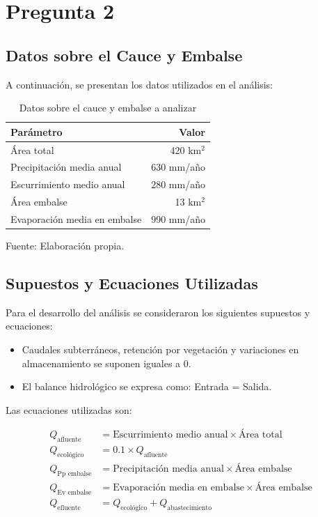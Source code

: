 \documentclass{article} %
\begin{document}
\newpage
\section{Pregunta 2}

\subsection{Datos sobre el Cauce y Embalse}

A continuación, se presentan los datos utilizados en el análisis:

\begin{table}[h]
    \centering
    \caption{Datos sobre el cauce y embalse a analizar}
    \begin{tabular}{lr}
        \toprule
        \textbf{Parámetro} & \textbf{Valor} \\
        \midrule
        Área total & 420 km\(^2\) \\
        Precipitación media anual & 630 mm/año \\
        Escurrimiento medio anual & 280 mm/año \\
        Área embalse & 13 km\(^2\) \\
        Evaporación media en embalse & 990 mm/año \\
        \bottomrule
    \end{tabular}
    Fuente: Elaboración propia.
\end{table}

\subsection{Supuestos y Ecuaciones Utilizadas}

Para el desarrollo del análisis se consideraron los siguientes supuestos y ecuaciones:

\begin{itemize}
    \item Caudales subterráneos, retención por vegetación y variaciones en almacenamiento se suponen iguales a 0.
    \item El balance hidrológico se expresa como: Entrada = Salida.
\end{itemize}

Las ecuaciones utilizadas son:

\begin{align}
    Q_{\text{afluente}} &= \text{Escurrimiento medio anual} \times \text{Área total} \\
    Q_{\text{ecológico}} &= 0.1 \times Q_{\text{afluente}} \\
    Q_{\text{Pp embalse}} &= \text{Precipitación media anual} \times \text{Área embalse} \\
    Q_{\text{Ev embalse}} &= \text{Evaporación media en embalse} \times \text{Área embalse} \\
    Q_{\text{efluente}} &= Q_{\text{ecológico}} + Q_{\text{abastecimiento}}
\end{align}
\end{document}

